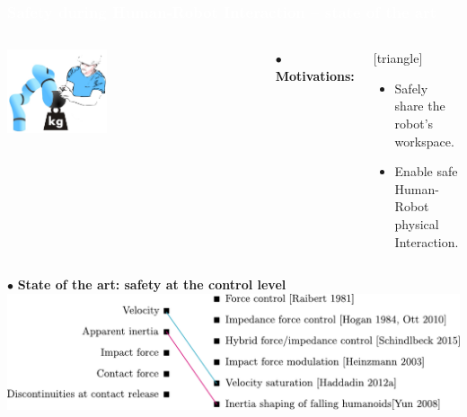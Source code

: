 \begin{frame}[noframenumbering]
  \frametitle{{\textcolor{white}{\hspace{0.3cm}Safety during Human-Robot Interaction -- state of the art}}}
  
 \vspace{-3mm} 
\begin{columns}
\column{.47\paperwidth}
\vspace{-5mm}
\begin{center}
\vspace{2mm}
\includegraphics[width=0.4\textwidth ]{figures/Human_robot_int.png}
\end{center}
 \vspace{-3mm} 
\column{.47\paperwidth}
$\bullet$ \textbf{Motivations:}                     
\begin{center}
[triangle]                        
\begin{itemize}
\item Safely share the robot's workspace.
\item Enable safe Human-Robot physical Interaction.
\end{itemize}                                            
\end{center}
\end{columns}

\vspace{7mm}
\hspace{-4mm}
$\bullet$ \textbf{State of the art: safety at the control level}
\vspace{6mm}
\includegraphics[width=1.0\textwidth]{figures/sttt2.pdf}
\vspace{-1mm}






\end{frame}




